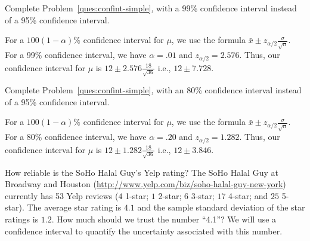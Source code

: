 \documentclass[answers,11pt]{exam}
\begin{document}
\begin{questions}

\question Complete Problem~\ref{ques:confint-simple}, with a 99\% confidence interval
instead of a 95\% confidence interval.

\begin{solution}
For a $100 (1 - \alpha) \%$ confidence interval for $\mu$, we use the formula
\(
  \bar x \pm z_{\alpha/2} \frac{\sigma}{\sqrt{n}}.
\)
For a 99\% confidence interval, we have $\alpha = .01$ and $z_{\alpha/2} =
2.576$.  Thus, our confidence interval for $\mu$ is
\(
  12 \pm 2.576 \frac{18}{\sqrt{36}}
\)
i.e.,
\(
  12 \pm 7.728. 
\)

\end{solution}



\question Complete Problem~\ref{ques:confint-simple}, with an 80\% confidence interval
instead of a 95\% confidence interval.

\begin{solution}
For a $100 (1 - \alpha) \%$ confidence interval for $\mu$, we use the formula
\(
  \bar x \pm z_{\alpha/2} \frac{\sigma}{\sqrt{n}}.
\)
For a 80\% confidence interval, we have $\alpha = .20$ and $z_{\alpha/2} =
1.282$.  Thus, our confidence interval for $\mu$ is
\(
  12 \pm 1.282 \frac{18}{\sqrt{36}}
\)
i.e.,
\(
  12 \pm 3.846.
\)

\end{solution}



\newpage

\question How reliable is the SoHo Halal Guy's Yelp rating? The SoHo Halal Guy
at Broadway and Houston
(\url{http://www.yelp.com/biz/soho-halal-guy-new-york}) currently has 53 Yelp
reviews ($4$ 1-star; $1$ 2-star; $6$ 3-star; $17$ 4-star; and $25$ 5-star).
The average star rating is $4.1$ and the sample standard deviation of the
star ratings is $1.2$. How much should we trust the number ``4.1''?  We will
use a confidence interval to quantify the uncertainty associated with this
number.

\end{questions}
\end{document}
